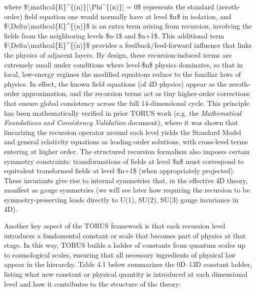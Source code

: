 \documentclass[]{article}
\begin{document}
where
\$\textbackslash{}mathcal\{E\}\^{}\{(n)\}{[}\textbackslash{}Phi\^{}\{(n)\}{]}
= 0\$ represents the standard (zeroth-order) field equation one would
normally have at level \$n\$ in isolation, and
\$\textbackslash{}Delta\textbackslash{}mathcal\{E\}\^{}\{(n)\}\$ is an
extra term arising from recursion, involving the fields from the
neighboring levels \$n-1\$ and \$n+1\$. This additional term
\$\textbackslash{}Delta\textbackslash{}mathcal\{E\}\^{}\{(n)\}\$
provides a feedback/feed-forward influence that links the physics of
adjacent layers. By design, these recursion-induced terms are extremely
small under conditions where level-\$n\$ physics dominates, so that in
local, low-energy regimes the modified equations reduce to the familiar
laws of physics. In effect, the known field equations (of 4D physics)
appear as the zeroth-order approximation, and the recursion terms act as
tiny higher-order corrections that ensure global consistency across the
full 14-dimensional cycle. This principle has been mathematically
verified in prior TORUS work (e.g. the \emph{Mathematical Foundations
and Consistency Validation} document), where it was shown that
linearizing the recursion operator around each level yields the Standard
Model and general relativity equations as leading-order solutions, with
cross-level terms entering at higher order. The structured recursion
formalism also imposes certain symmetry constraints: transformations of
fields at level \$n\$ must correspond to equivalent transformed fields
at level \$n+1\$ (when appropriately projected). These invariants give
rise to internal symmetries that, in the effective 4D theory, manifest
as gauge symmetries (we will see later how requiring the recursion to be
symmetry-preserving leads directly to U(1), SU(2), SU(3) gauge
invariance in 4D).

Another key aspect of the TORUS framework is that each recursion level
introduces a fundamental constant or scale that becomes part of physics
at that stage. In this way, TORUS builds a ladder of constants from
quantum scales up to cosmological scales, ensuring that all necessary
ingredients of physical law appear in the hierarchy. Table 4.1 below
summarizes the 0D--13D constant ladder, listing what new constant or
physical quantity is introduced at each dimensional level and how it
contributes to the structure of the theory:
\end{document}
